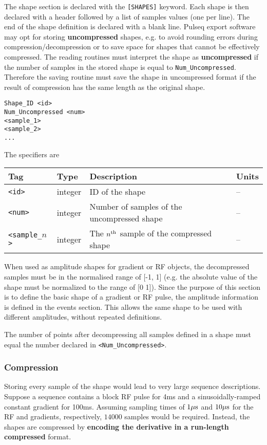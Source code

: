 \documentclass{article}
\begin{document}
The shape section is declared with the \verb.[SHAPES]. keyword. Each shape is then declared with a header followed by a list of samples values (one per line). The end of the shape definition is declared with a blank line. Pulseq export software may opt for storing \textbf{uncompressed} shapes, e.g. to avoid rounding errors during compression/decompression or to save space for shapes that cannot be effectively compressed. The reading routines must interpret the shape as \textbf{uncompressed} if the number of samples in the stored shape is equal to \verb.Num_Uncompressed.. Therefore the saving routine must save the shape in uncompressed format if the result of compression has the same length as the original shape.

\begin{lstlisting}
Shape_ID <id>
Num_Uncompressed <num>
<sample_1>
<sample_2>
...
\end{lstlisting}

The specifiers are

\begin{tabularx}{\textwidth}{llXl}
\toprule
Tag & Type & Description & Units\\
\midrule
\verb.<id>. & integer & ID of the shape & -- \\
\verb.<num>. & integer & Number of samples of the uncompressed shape & -- \\
\verb.<sample_.$n$\verb.>. & integer & The $n^{\rm th}$ sample of the compressed shape  & -- \\
\bottomrule
\end{tabularx}

When used as amplitude shapes for gradient or RF objects, the decompressed samples must be in the normalised range of [-1, 1] (e.g. the absolute value of the shape must be normalized to the range of [0 1]). Since the purpose of this section is to define the basic shape of a gradient or RF pulse, the amplitude information is defined in the events section. This allows the same shape to be used with different amplitudes, without repeated definitions.

The number of points after decompressing all samples defined in a shape must equal the number declared in \verb.<Num_Uncompressed>..

\subsubsection{Compression}

Storing every sample of the shape would lead to very large sequence descriptions. Suppose a sequence contains a block RF pulse for 4ms and a sinusoidally-ramped constant gradient for 100ms. Assuming sampling times of $1{\rm \mu s}$ and $10{\rm \mu s}$ for the RF and gradients, respectively, $14000$ samples would be required. Instead, the shapes are compressed by \textbf{encoding the derivative in a run-length compressed} format. 
\end{document}
